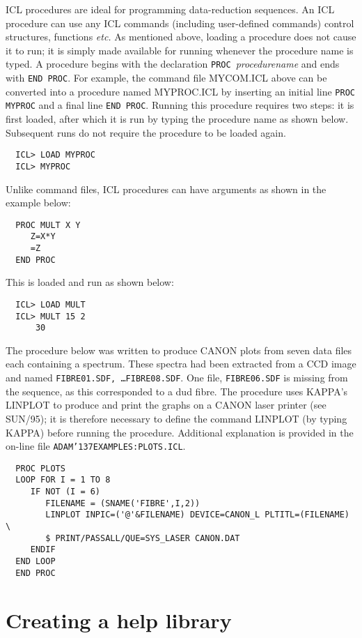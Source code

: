 \documentclass[twoside,11pt]{article}
\renewcommand{\_}{{\tt\char'137}}
\newcommand{\xref}[3]{#1}
\newcommand{\xlabel}[1]{}
\begin{document}
ICL procedures are ideal for programming data-reduction sequences.
An ICL procedure can use any ICL commands (including user-defined commands)
control structures, functions {\it etc.} 
As mentioned above, loading a procedure does not
cause it to run; it is simply made available for running whenever the 
procedure name is typed.
A procedure begins with the declaration {\tt PROC}~{\sl procedurename}
and ends with {\tt END PROC}.
For example, the command file MYCOM.ICL above can be converted into a 
procedure named MYPROC.ICL by inserting an initial line 
\verb+PROC MYPROC+ and a final line \verb+END PROC+.
Running this procedure requires two steps: it is  first loaded, after which 
it is 
run by typing the procedure name
as shown below.
Subsequent runs do not require the procedure to be loaded again.
\begin{verbatim}
  ICL> LOAD MYPROC      
  ICL> MYPROC          
\end{verbatim}
Unlike command files, ICL procedures can have arguments as shown in the
example below:
\begin{verbatim}
  PROC MULT X Y
     Z=X*Y
     =Z
  END PROC
\end{verbatim}
This is loaded and run as shown below:
\begin{verbatim}
  ICL> LOAD MULT
  ICL> MULT 15 2
      30
\end{verbatim}
The procedure below was written to produce CANON plots from seven 
data files each containing a spectrum. 
These spectra had been extracted from a CCD image and named 
{\tt FIBRE01.SDF,  \ldots FIBRE08.SDF}. One file, 
{\tt FIBRE06.SDF}  is missing from the sequence, as this corresponded to 
a dud fibre.
The procedure uses KAPPA's LINPLOT to produce and print
the graphs on a CANON laser printer (see \xref{SUN/95}{sun95}{}); it is
therefore necessary to define the command LINPLOT 
(by typing KAPPA) before running the procedure. Additional explanation is 
provided in the on-line file {\tt ADAM\_EXAMPLES:PLOTS.ICL}.
\begin{verbatim}
  PROC PLOTS
  LOOP FOR I = 1 TO 8
     IF NOT (I = 6)
        FILENAME = (SNAME('FIBRE',I,2))
        LINPLOT INPIC=('@'&FILENAME) DEVICE=CANON_L PLTITL=(FILENAME) \
        $ PRINT/PASSALL/QUE=SYS_LASER CANON.DAT
     ENDIF
  END LOOP
  END PROC
\end{verbatim}

\newpage
\section{Creating a help library\label{help}\xlabel{creating_a_help_library}}
\end{document}
